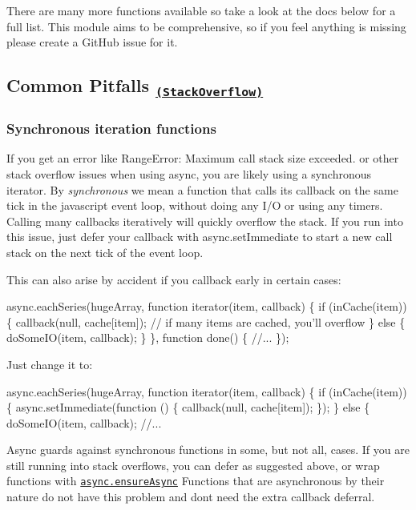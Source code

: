 There are many more functions available so take a look at the docs below for a full list. This module aims to be comprehensive, so if you feel anything is missing please create a Git\+Hub issue for it.

\subsection*{Common Pitfalls \textsubscript{\href{http://stackoverflow.com/questions/tagged/async.js}{\tt (Stack\+Overflow)}}}

\subsubsection*{Synchronous iteration functions}

If you get an error like {\ttfamily Range\+Error\+: Maximum call stack size exceeded.} or other stack overflow issues when using async, you are likely using a synchronous iterator. By {\itshape synchronous} we mean a function that calls its callback on the same tick in the javascript event loop, without doing any I/O or using any timers. Calling many callbacks iteratively will quickly overflow the stack. If you run into this issue, just defer your callback with {\ttfamily async.\+set\+Immediate} to start a new call stack on the next tick of the event loop.

This can also arise by accident if you callback early in certain cases\+:


\begin{DoxyCode}
async.eachSeries(hugeArray, function iterator(item, callback) \{
  if (inCache(item)) \{
    callback(null, cache[item]); // if many items are cached, you'll overflow
  \} else \{
    doSomeIO(item, callback);
  \}
\}, function done() \{
  //...
\});
\end{DoxyCode}


Just change it to\+:


\begin{DoxyCode}
async.eachSeries(hugeArray, function iterator(item, callback) \{
  if (inCache(item)) \{
    async.setImmediate(function () \{
      callback(null, cache[item]);
    \});
  \} else \{
    doSomeIO(item, callback);
  //...
\end{DoxyCode}


Async guards against synchronous functions in some, but not all, cases. If you are still running into stack overflows, you can defer as suggested above, or wrap functions with \href{#ensureAsync}{\tt {\ttfamily async.\+ensure\+Async}} Functions that are asynchronous by their nature do not have this problem and don\textquotesingle{}t need the extra callback deferral.

